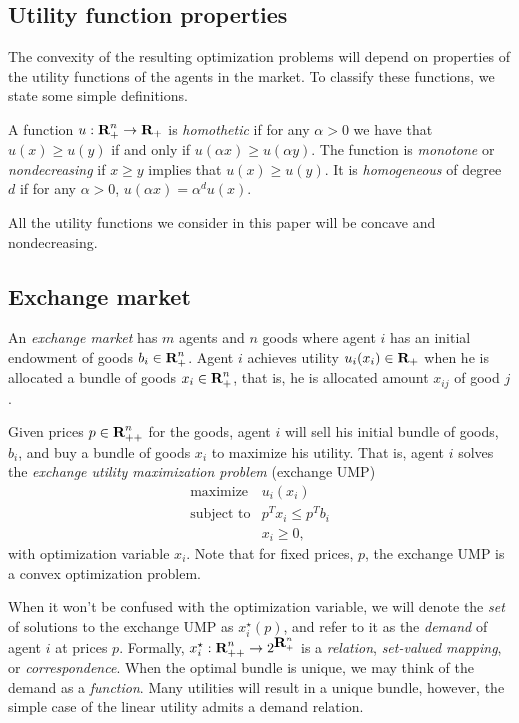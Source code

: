 \documentclass[12pt]{article}
\begin{document}
\subsection{Utility function properties}

The convexity of the resulting optimization problems will depend on properties
of the utility functions of the agents in the market. To classify these
functions, we state some simple definitions.

A function $u: {\mbox{\bf R}}^n_+ \to {\mbox{\bf R}}_+$ is \emph{homothetic} if for any $\alpha
> 0$ we have that $u(x) \geq u(y)$ if and only if $u(\alpha x) \geq u(\alpha
y)$. The function is \emph{monotone} or \emph{nondecreasing} if $x \geq y$
implies that $u(x) \geq u(y)$. It is \emph{homogeneous} of degree $d$ if for
any $\alpha > 0$, $u(\alpha x) = \alpha^d u(x)$.

All the utility functions we consider in this paper will be concave and
nondecreasing.

\subsection{Exchange market}
\label{sec:exchange_def}

An \emph{exchange market} has $m$ agents and $n$ goods where agent $i$ has an
initial endowment of goods $b_i \in {\mbox{\bf R}}_+^n$. Agent $i$ achieves utility
$u_i(x_i) \in {\mbox{\bf R}}_+$ when he is allocated a bundle of goods $x_i \in
{\mbox{\bf R}}^n_{+}$, that is, he is allocated amount $x_{ij}$ of good $j$.

Given prices $p \in {\mbox{\bf R}}^n_{++}$ for the goods, agent $i$ will sell his
initial bundle of goods, $b_i$, and buy a bundle of goods $x_i$ to maximize his
utility. That is, agent $i$ solves the \emph{exchange utility maximization
problem} (exchange UMP)
\begin{equation}
\label{p-ump}
\begin{array}{ll}
\mbox{maximize} & u_i(x_i) \\
\mbox{subject to} & p^T x_i \leq p^T b_i \\
& x_i \geq 0,
\end{array}
\end{equation}
with optimization variable $x_i$. Note that for fixed prices, $p$, the exchange
UMP is a convex optimization problem.

When it won't be confused with the optimization variable, we will denote the
\emph{set} of solutions to the exchange UMP as $x^\star_i(p)$, and refer to it
as the \emph{demand} of agent $i$ at prices $p$.
Formally, $x_i^\star : {\mbox{\bf R}}^n_{++} \to 2^{{\mbox{\bf R}}^n_+}$ is a \emph{relation},
\emph{set-valued mapping}, or \emph{correspondence}. When the optimal bundle is
unique, we may think of the demand as a \emph{function}.
Many utilities will result in a unique bundle, however, the simple 
case of the linear utility admits a demand relation.
\end{document}
